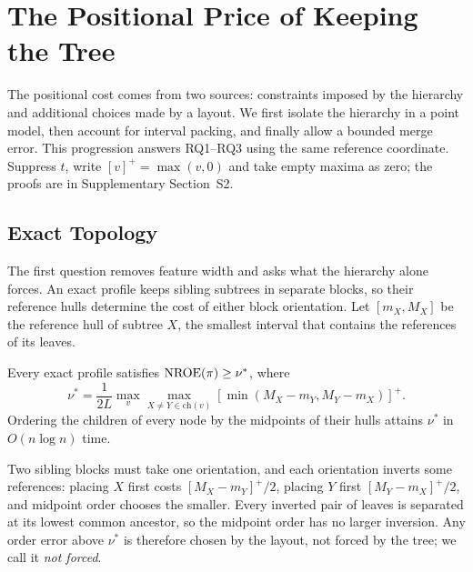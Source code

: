\section{The Positional Price of Keeping the Tree}\label{sec:bounds}
The positional cost comes from two sources: constraints imposed by the hierarchy and additional choices made by a layout. We first isolate the hierarchy in a point model, then account for interval packing, and finally allow a bounded merge error. This progression answers RQ1--RQ3 using the same reference coordinate. Suppress $t$, write $[v]^+=\max(v,0)$ and take empty maxima as zero; the proofs are in Supplementary Section~S2.

\subsection{Exact Topology}
The first question removes feature width and asks what the hierarchy alone forces. An exact profile keeps sibling subtrees in separate blocks, so their reference hulls determine the cost of either block orientation. Let $[m_X,M_X]$ be the reference hull of subtree $X$, the smallest interval that contains the references of its leaves.
\begin{proposition}\label{thm:order}
Every exact profile satisfies $\mathrm{NROE}(\pi)\ge\nu^*$, where
\begin{equation}\label{eq:nu}
\nu^*=\frac{1}{2L}\max_v\max_{X\ne Y\in\mathrm{ch}(v)}[\min(M_X-m_Y,M_Y-m_X)]^+.
\end{equation}
Ordering the children of every node by the midpoints of their hulls attains $\nu^*$ in $O(n\log n)$ time.
\end{proposition}
Two sibling blocks must take one orientation, and each orientation inverts some references: placing $X$ first costs $[M_X-m_Y]^+/2$, placing $Y$ first $[M_Y-m_X]^+/2$, and midpoint order chooses the smaller. Every inverted pair of leaves is separated at its lowest common ancestor, so the midpoint order has no larger inversion. Any order error above $\nu^*$ is therefore chosen by the layout, not forced by the tree; we call it \emph{not forced}.

